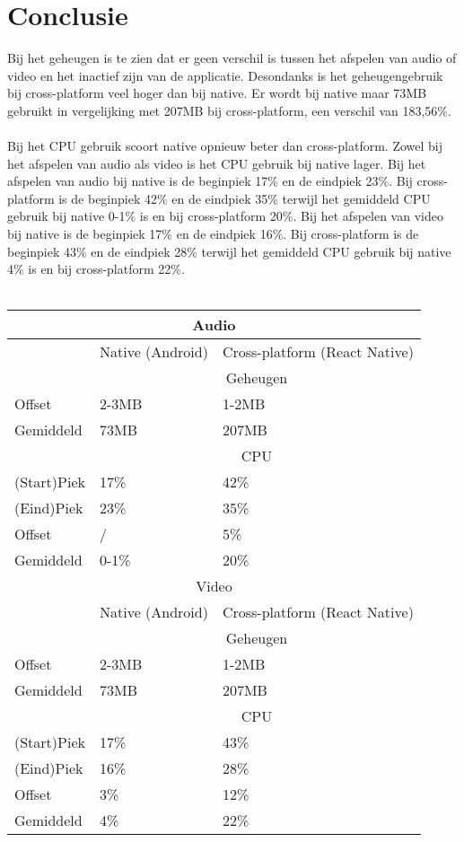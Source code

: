 \section{Conclusie}
Bij het geheugen is te zien dat er geen verschil is tussen het afspelen van audio of video 
en het inactief zijn van de applicatie. Desondanks is het geheugengebruik bij cross-platform veel 
hoger dan bij native. Er wordt bij native maar 73MB gebruikt in vergelijking met 207MB 
bij cross-platform, een verschil van 183,56\%.
\\\\
Bij het CPU gebruik scoort native opnieuw beter dan cross-platform. Zowel bij het afspelen van audio als video 
is het CPU gebruik bij native lager. Bij het afspelen van audio bij 
native is de beginpiek 17\% en de eindpiek 23\%. Bij cross-platform is de 
beginpiek 42\% en de eindpiek 35\% terwijl het gemiddeld CPU gebruik bij native 0-1\% is en bij
cross-platform 20\%. Bij het afspelen van video bij native is de beginpiek 17\% en de eindpiek 16\%.
Bij cross-platform is de beginpiek 43\% en de eindpiek 28\% terwijl het gemiddeld CPU gebruik bij
native 4\% is en bij cross-platform 22\%. 
\\\\
\begin{tabular}{ |p{3cm}||p{5cm}|p{5cm}| }
    \hline
    \multicolumn{3}{|c|}{Audio} \\ 
    \hline
     & Native (Android) & Cross-platform (React Native) \\
    \hline
     & \multicolumn{2}{|c|}{Geheugen} \\ 
    \hline
    Offset & 2-3MB & 1-2MB \\
    Gemiddeld & 73MB & 207MB \\
    \hline
     & \multicolumn{2}{|c|}{CPU} \\
    \hline
    (Start)Piek & 17\% & 42\% \\
    (Eind)Piek & 23\% & 35\% \\
    Offset & / & 5\% \\
    Gemiddeld & 0-1\% & 20\% \\
    \hline
    \multicolumn{3}{|c|}{Video} \\ 
    \hline
     & Native (Android) & Cross-platform (React Native) \\
    \hline
     & \multicolumn{2}{|c|}{Geheugen} \\ 
    \hline
    Offset & 2-3MB & 1-2MB \\
    Gemiddeld & 73MB & 207MB \\
    \hline
     & \multicolumn{2}{|c|}{CPU} \\
    \hline
    (Start)Piek & 17\% & 43\% \\
    (Eind)Piek & 16\% & 28\% \\
    Offset & 3\% & 12\% \\
    Gemiddeld & 4\% & 22\% \\
    \hline
\end{tabular}

